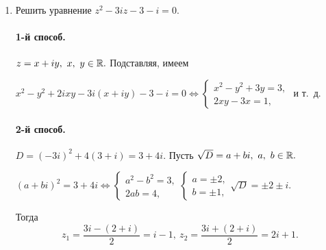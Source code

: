 \documentclass[../../main.tex]{subfiles}
\begin{document}
\begin{examples}
\begin{enumerate}
		\item Решить уравнение $z^2 - 3iz - 3- i = 0.$
		
		\paragraph{1-й способ.} $z = x+iy,\ x,\ y\in\mathbb{R}.$ Подставляя, имеем
		
		$x^2 - y^2 +2ixy - 3i(x+iy) - 3- i =0 \iff
		\begin{cases} 
		x^2 - y^2 + 3y  = 3,\\
		2xy - 3x  =1,
		\end{cases}$ и т.~д.
		
		\paragraph{2-й способ.}
		$D = (-3i)^2 + 4(3+i) =3+4i.$ Пусть $\sqrt{D} = a + bi,\ a,\ b \in \mathbb{R}.$
		
		$(a+bi)^2 = 3+4i \iff 
		\begin{cases} 
		a^2 - b^2 = 3,\\
		2ab  = 4,
		\end{cases}
		\begin{cases} 
		a = \pm 2,\\
		b  = \pm 1,
		\end{cases}
		\sqrt{D} = \pm2\pm i.
		$
		
		Тогда \[z_1 = \frac{3i - (2+i)}{2} = i-1,\ z_2 = \frac{3i + (2+i)}{2} =2i+1.\]
		\end{enumerate}
		\end{examples}
\end{document}
